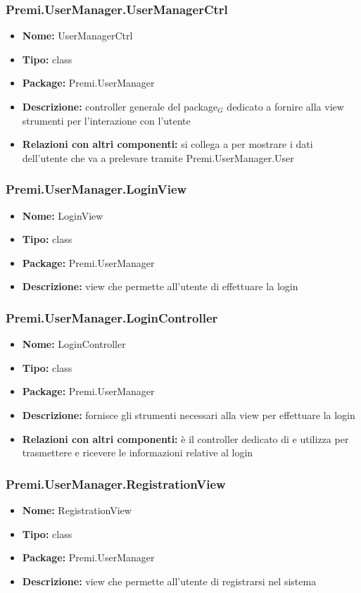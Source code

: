 \subsubsection{Premi.UserManager.UserManagerCtrl}
\begin{itemize}
  \item \textbf{Nome:} UserManagerCtrl
  \item \textbf{Tipo:} class
  \item \textbf{Package:} Premi.UserManager
  \item \textbf{Descrizione:} controller generale del package$_G$  dedicato a fornire alla view strumenti per l'interazione con l'utente
  \item \textbf{Relazioni con altri componenti:} si collega a  per mostrare i dati dell'utente che va a prelevare tramite {Premi.UserManager.User}
\end{itemize}
\subsubsection{Premi.UserManager.LoginView}
\begin{itemize}
  \item \textbf{Nome:} LoginView
  \item \textbf{Tipo:} class
  \item \textbf{Package:} Premi.UserManager
  \item \textbf{Descrizione:} view che permette all'utente di effettuare la login
\end{itemize}
\subsubsection{Premi.UserManager.LoginController}
\begin{itemize}
  \item \textbf{Nome:} LoginController
  \item \textbf{Tipo:} class
  \item \textbf{Package:} Premi.UserManager
  \item \textbf{Descrizione:} fornisce gli strumenti necessari alla view per effettuare la login
  \item \textbf{Relazioni con altri componenti:} è il controller dedicato di  e utilizza  per trasmettere e ricevere le informazioni relative al login
\end{itemize}
\subsubsection{Premi.UserManager.RegistrationView}
\begin{itemize}
  \item \textbf{Nome:} RegistrationView
  \item \textbf{Tipo:} class
  \item \textbf{Package:} Premi.UserManager
  \item \textbf{Descrizione:} view che permette all'utente di registrarsi nel sistema
\end{itemize}
